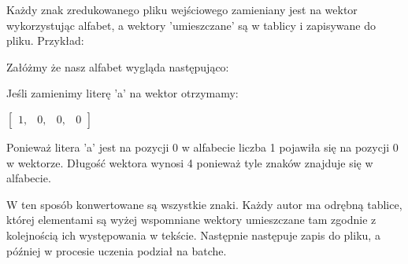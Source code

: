 Każdy znak zredukowanego pliku wejściowego zamieniany jest na wektor wykorzystując alfabet, 
a wektory 'umieszczane' są w tablicy i zapisywane do pliku. Przykład:

Załóżmy że nasz alfabet wygląda następująco:

Jeśli zamienimy literę 'a' na wektor otrzymamy: 
 
\vspace{2mm}
$
\begin{bmatrix} 
1, & 0, & 0, & 0
\end{bmatrix} 
$
\vspace{2mm}

Ponieważ litera 'a' jest na pozycji 0 w alfabecie liczba 1 pojawiła się na pozycji 0 w wektorze.
Długość wektora wynosi 4 ponieważ tyle znaków znajduje się w alfabecie.

W ten sposób konwertowane są wszystkie znaki.
Każdy autor ma odrębną tablice, której elementami są wyżej wspomniane wektory umieszczane tam zgodnie 
z kolejnością ich występowania w tekście. 
Następnie następuje zapis do pliku, a później w procesie uczenia podział na batche.